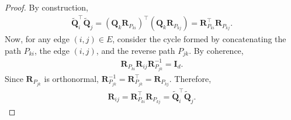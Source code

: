 \documentclass[10pt,a4paper]{amsart}
\begin{document}
\begin{proof}
By construction,
\begin{align}
    \widetilde{\mathbf{Q}}_i^\top \widetilde{\mathbf{Q}}_j
    = (\mathbf{Q}_k \mathbf{R}_{P_{ki}})^\top (\mathbf{Q}_k \mathbf{R}_{P_{kj}})
    = \mathbf{R}_{P_{ki}}^\top \mathbf{R}_{P_{kj}}.
\end{align}
Now, for any edge $(i,j) \in E$, consider the cycle formed by 
concatenating the path $P_{ki}$, the edge $(i,j)$, and the reverse 
path $P_{jk}$. By coherence, 
\begin{align}
    \mathbf{R}_{P_{ki}} \mathbf{R}_{ij} \mathbf{R}_{P_{jk}}^{-1} = \mathbf{I}_d.
\end{align}
Since $\mathbf{R}_{P_{jk}}$ is orthonormal, $\mathbf{R}_{P_{jk}}^{-1} = \mathbf{R}_{P_{jk}}^\top = \mathbf{R}_{P_{kj}}$. Therefore,
\begin{align}
    \mathbf{R}_{ij} = \mathbf{R}_{P_{ki}}^\top \mathbf{R}_{P_{kj}} = 
    \widetilde{\mathbf{Q}}_i^\top \widetilde{\mathbf{Q}}_j.
\end{align}
\end{proof}
\end{document}
